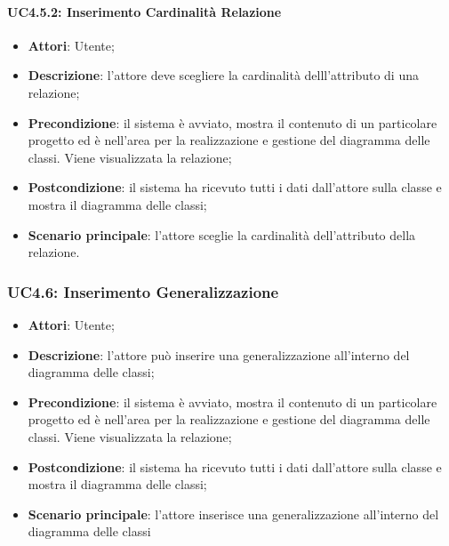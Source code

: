 \paragraph{UC4.5.2: Inserimento Cardinalità Relazione}
\label{UC4.5.2}
\begin{itemize}
	\item \textbf{Attori}: Utente;
	\item \textbf{Descrizione}: l'attore deve scegliere la cardinalità delll'attributo di una relazione;
	\item \textbf{Precondizione}: il sistema è avviato, mostra il contenuto di un particolare progetto ed è nell'area per la realizzazione e gestione del diagramma delle classi. Viene visualizzata la relazione;
	\item \textbf{Postcondizione}: il sistema ha ricevuto tutti i dati dall'attore sulla classe e mostra il diagramma delle classi;
	\item \textbf{Scenario principale}: l'attore sceglie la cardinalità dell'attributo della relazione.
\end{itemize}

\subsubsection{UC4.6: Inserimento Generalizzazione}
\label{UC4.6}
\begin{itemize}
	\item \textbf{Attori}: Utente;
	\item \textbf{Descrizione}: l'attore può inserire una generalizzazione all'interno del diagramma delle classi;
	\item \textbf{Precondizione}: il sistema è avviato, mostra il contenuto di un particolare progetto ed è nell'area per la realizzazione e gestione del diagramma delle classi. Viene visualizzata la relazione;
	\item \textbf{Postcondizione}: il sistema ha ricevuto tutti i dati dall'attore sulla classe e mostra il diagramma delle classi;
	\item \textbf{Scenario principale}: l'attore inserisce una generalizzazione all'interno del diagramma delle classi
\end{itemize}


